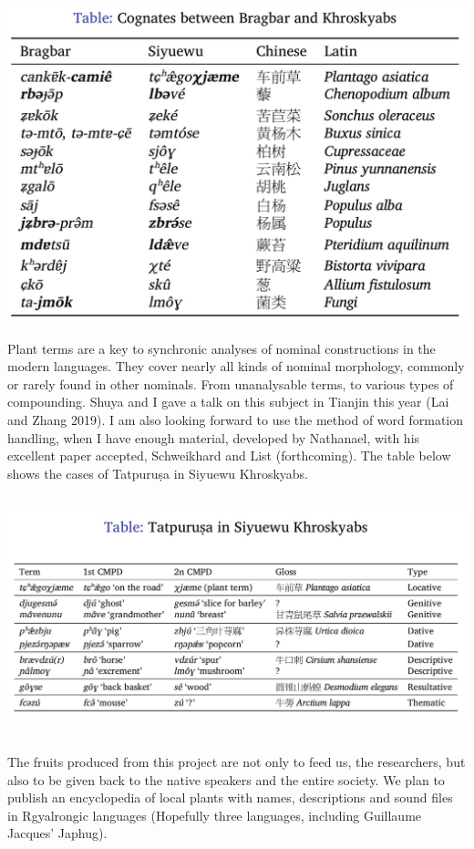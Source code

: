 \documentclass[
  a4paper,
  14pt,
  oneside,
  tablecaptionabove
]{scrbook}
\begin{document}
\includegraphics[width=5.29167in,height=3.625in]{images/2691575731829_.pic_hd.jpg}

Plant terms are a key to synchronic analyses of nominal constructions in
the modern languages. They cover nearly all kinds of nominal morphology,
commonly or rarely found in other nominals. From unanalysable terms, to
various types of compounding. Shuya and I gave a talk on this subject in
Tianjin this year (Lai and Zhang 2019). I am also looking forward to use
the method of word formation handling, when I have enough material,
developed by Nathanael, with his excellent paper accepted, Schweikhard
and List (forthcoming). The table below shows the cases of Tatpuruṣa in
Siyuewu Khroskyabs.

\includegraphics[width=6.11458in,height=2.75in]{images/2701575731864_.pic_hd.jpg}

The fruits produced from this project are not only to feed us, the
researchers, but also to be given back to the native speakers and the
entire society. We plan to publish an encyclopedia of local plants with
names, descriptions and sound files in Rgyalrongic languages (Hopefully
three languages, including Guillaume Jacques' Japhug).
\end{document}
